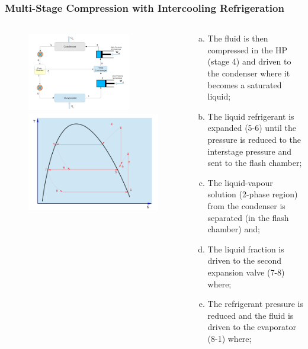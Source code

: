 \documentclass[10pt,compress]{beamer}
\begin{document}
\begin{frame}
 \frametitle{Multi-Stage Compression with Intercooling Refrigeration}
 \begin{columns}
  \begin{column}[c]{0.45\linewidth}
   \begin{figure}%
     \vbox{
      \includegraphics[width=4.5cm,height=3.5cm,clip]{./Pics/Overview_Refrig26}
      \vspace{-.1cm}
      \includegraphics[width=4.cm,height=4.cm,clip]{./Pics/Overview_Refrig27}}
   \end{figure}  
  \end{column}  
  \begin{column}[c]{0.55\linewidth}
   \begin{enumerate}[(a)]
    \item <1-> The fluid is then compressed in the HP (stage 4) and driven to the condenser where it becomes a saturated liquid;
    \item <2-> The liquid refrigerant is expanded (5-6) until the pressure is reduced to the interstage pressure and sent to the flash chamber;
    \item <3-> The liquid-vapour solution (2-phase region) from the condenser is separated (in the flash chamber) and;
    \item <4-> The liquid fraction is driven to the second expansion valve (7-8) where;
    \item <5-> The refrigerant pressure is reduced and the fluid is driven to the evaporator (8-1) where;
   \end{enumerate}
  \end{column}  
 \end{columns} 
\end{frame}
\end{document}
